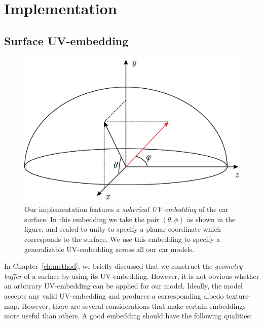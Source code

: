 \chapter{Implementation} \label{ch:implementation}

\section{Surface UV-embedding} \label{sec:uv-embedding}

\begin{figure}[t]
    \centering
    \caption{Our implementation features a \emph{spherical UV-embedding} of the car surface.
        In this embedding we take the pair $(\theta, \phi)$ as shown in the figure, and
        scaled to unity to specify a planar coordinate which corresponds to the surface. We
        use this embedding to specify a generalizable UV-embedding across all our car models.}
    \label{fig:spherical}
    \vspace{0.2in}
    \includegraphics[width=.9\linewidth]{graphics/spherical.png}
\end{figure}

In Chapter~\ref{ch:method}, we briefly discussed that we construct the \emph{geometry buffer}
of a surface by using its UV-embedding. However, it is not obvious whether an arbitrary
UV-embedding can be applied for our model. Ideally, the model accepts any valid UV-embedding
and produces a corresponding albedo texture-map. However, there are several considerations
that make certain embeddings more useful than others. A good embedding should have the
following qualities:


